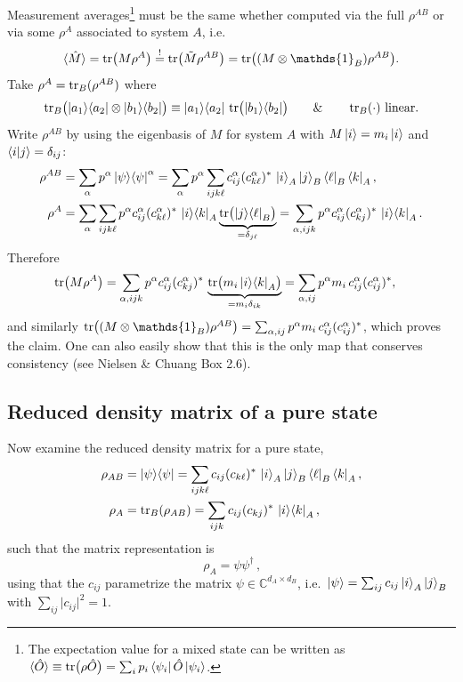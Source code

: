 \documentclass[../../main.tex]{subfiles}
\begin{document}
Measurement averages\footnote{The expectation value for a mixed state can be written as $\langle \hat O \rangle \equiv \operatorname{tr}\bigl(\rho \hat O\bigr) = \sum_i p_i \left\langle \psi_i \right\rvert \hat O \left\lvert \psi_i \right\rangle$.} must be the same whether computed via the full $\rho^{AB}$ or via some
$\rho^{A}$ associated to system $A$, i.e.
\begin{equation}
\langle \hat M \rangle = \Trace\bigl(M\rho^A\bigr)\overset{!}{=}\Trace\bigl(\tilde M\rho^{AB}\bigr)
=\Trace\bigl((M\otimes\mathds{1}_B)\rho^{AB}\bigr).
\end{equation}
Take $\rho^A=\operatorname{tr}_B(\rho^{AB})$ where
\begin{equation}
\operatorname{tr}_B\bigl(\left\lvert a_1 \right\rangle\!\left\langle a_2 \right\rvert\otimes\left\lvert b_1 \right\rangle\!\left\langle b_2 \right\rvert\bigr)
\equiv\left\lvert a_1 \right\rangle\!\left\langle a_2 \right\rvert\,\operatorname{tr}\bigl(\left\lvert b_1 \right\rangle\!\left\langle b_2 \right\rvert\bigr)
\qquad\&\qquad\operatorname{tr}_B(\cdot)\ \text{linear.}
\end{equation}
Write $\rho^{AB}$ by using the eigenbasis of $M$ for system $A$ with $M\left\lvert i \right\rangle=m_i\left\lvert i \right\rangle$ and
$\left\langle i \middle| j \right\rangle=\delta_{ij}$:
\begin{align}
\rho^{AB}&=\sum_\alpha p^\alpha\left\lvert \psi \right\rangle\!\left\langle \psi \right\rvert^\alpha
=\sum_\alpha p^\alpha\sum_{ijk\ell}c_{ij}^\alpha(c_{k\ell}^\alpha)^*\,
\left\lvert i \right\rangle_A\left\lvert j \right\rangle_B\left\langle \ell \right\rvert_B\left\langle k \right\rvert_A,\\
\rho^{A}&=\sum_\alpha\sum_{ijk\ell}p^\alpha c_{ij}^\alpha(c_{k\ell}^\alpha)^*\,
\left\lvert i \right\rangle\!\left\langle k \right\rvert_A\underbrace{\operatorname{tr}\bigl(\left\lvert j \right\rangle\!\left\langle \ell \right\rvert_B\bigr)}_{=\delta_{j\ell}}
=\sum_{\alpha,ijk}p^\alpha c_{ij}^\alpha(c_{kj}^\alpha)^*\,\left\lvert i \right\rangle\!\left\langle k \right\rvert_A.
\end{align}
Therefore
\begin{align}
\operatorname{tr}\bigl(M\rho^A\bigr)
&=\sum_{\alpha,ijk}p^\alpha c_{ij}^\alpha(c_{kj}^\alpha)^*\,
\underbrace{\operatorname{tr}\bigl(m_i\left\lvert i \right\rangle\!\left\langle k \right\rvert_A\bigr)}_{=m_i\delta_{ik}}
=\sum_{\alpha,ij}p^\alpha m_i\,c_{ij}^\alpha(c_{ij}^\alpha)^*,
\end{align}
and similarly $\Trace\bigl((M\otimes\mathds{1}_B)\rho^{AB}\bigr)
=\sum_{\alpha,ij}p^\alpha m_i\,c_{ij}^\alpha(c_{ij}^\alpha)^*$, which proves the claim. One can
also easily show that this is the only map that conserves consistency (see Nielsen \& Chuang Box 2.6).

\subsection{Reduced density matrix of a pure state}

Now examine the reduced density matrix for a pure state,
\begin{align}
\rho_{AB}&=\left\lvert \psi \right\rangle\!\left\langle \psi \right\rvert
=\sum_{ijk\ell}c_{ij}(c_{k\ell})^*\,\left\lvert i \right\rangle_A\left\lvert j \right\rangle_B\left\langle \ell \right\rvert_B\left\langle k \right\rvert_A,\\
\rho_A&=\operatorname{tr}_B(\rho_{AB})=\sum_{ijk}c_{ij}(c_{kj})^*\,\left\lvert i \right\rangle\!\left\langle k \right\rvert_A, \label{eq:reduced_density_matrix_as_operator}
\end{align}
such that the matrix representation is
\begin{equation}
\boxed{\,\rho_A=\psi\psi^\dagger\,}, \label{eq:density_matrix_as_wavefunction_coefficients}
\end{equation}
using that the $c_{ij}$ parametrize the matrix $\psi\in\mathbb C^{d_A\times d_B}$, i.e.\
$\left\lvert \psi \right\rangle=\sum_{ij}c_{ij}\left\lvert i \right\rangle_A\left\lvert j \right\rangle_B$ with $\sum_{ij} \vert c_{ij} \vert^2 = 1$.
\end{document}
